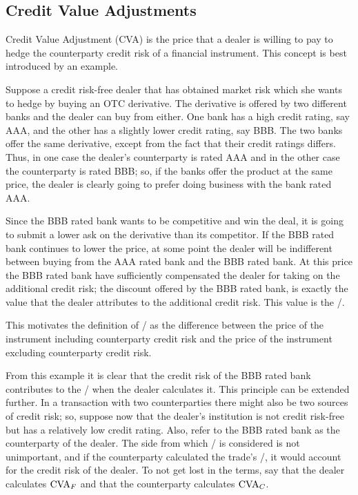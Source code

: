 \documentclass[main.tex]{subfiles}
\begin{document}
    \subsection{Credit Value Adjustments}
        Credit Value Adjustment (CVA) is the price that a dealer is willing to pay 
        to hedge the counterparty credit risk of a financial instrument.
        This concept is best introduced by an example. 
        
        \begin{example}
        Suppose a credit risk-free dealer that has obtained market risk 
        which she wants to hedge by buying an OTC derivative.
        The derivative is offered by two different banks and the dealer can buy from either.
        One bank has a high credit rating, say AAA, and the other has a slightly lower credit rating, say BBB. 
        The two banks offer the same derivative, except from the fact that their credit ratings differs.
        Thus, in one case the dealer's counterparty is rated AAA and in the other case the counterparty is rated BBB;
        so, if the banks offer the product at the same price, 
        the dealer is clearly going to prefer doing business with the bank rated AAA.

        Since the BBB rated bank wants to be competitive and win the deal,
        it is going to submit a lower ask on the derivative than its competitor.
        If the BBB rated bank continues to lower the price, 
        at some point the dealer will be indifferent between buying 
        from the AAA rated bank and the BBB rated bank.
        At this price the BBB rated bank have sufficiently compensated the dealer for taking on the additional credit risk;
        the discount offered by the BBB rated bank, 
        is exactly the value that the dealer attributes to the additional credit risk. 
        This value is the \CVA/.

        This motivates the definition of \CVA/ as the difference between the price of the instrument 
        including counterparty credit risk and the price of the instrument excluding counterparty credit risk.
        \end{example}

        From this example it is clear that the credit risk of the BBB rated bank contributes to the \CVA/
        when the dealer calculates it.
        This principle can be extended further.
        In a transaction with two counterparties there might also be two sources of credit risk;
        so, suppose now that the dealer's institution is not credit risk-free 
        but has a relatively low credit rating.
        Also, refer to the BBB rated bank as the counterparty of the dealer.
        The side from which \CVA/ is considered is not unimportant,
        and if the counterparty calculated the trade's \CVA/, it would account for the credit risk of the dealer.
        To not get lost in the terms, say that the dealer calculates $\CVA/_{F}$ 
        and that the counterparty calculates $\CVA/_{C}$.
\end{document}
